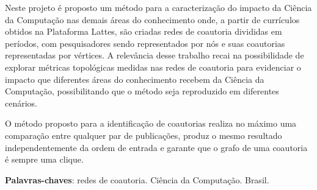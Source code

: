 
\setlength{\absparsep}{18pt} %
\begin{resumo}
    
    Neste projeto é proposto um método para a caracterização do impacto da Ciência da Computação nas demais áreas do conhecimento onde, a partir de currículos obtidos na Plataforma Lattes, são criadas redes de coautoria divididas em períodos, com pesquisadores sendo representados por nós e suas coautorias representadas por vértices. A relevância desse trabalho recai na possibilidade de explorar métricas topológicas medidas nas redes de coautoria para evidenciar o impacto que diferentes áreas do conhecimento recebem da Ciência da Computação, possibilitando que o método seja reproduzido em diferentes cenários.
    
    O método proposto para a identificação de coautorias realiza no máximo uma comparação entre qualquer par de publicações, produz o mesmo resultado independentemente da ordem de entrada e garante que o grafo de uma coautoria é sempre uma clique.

    \textbf{Palavras-chaves}: redes de coautoria. Ciência da Computação. Brasil.
\end{resumo}



